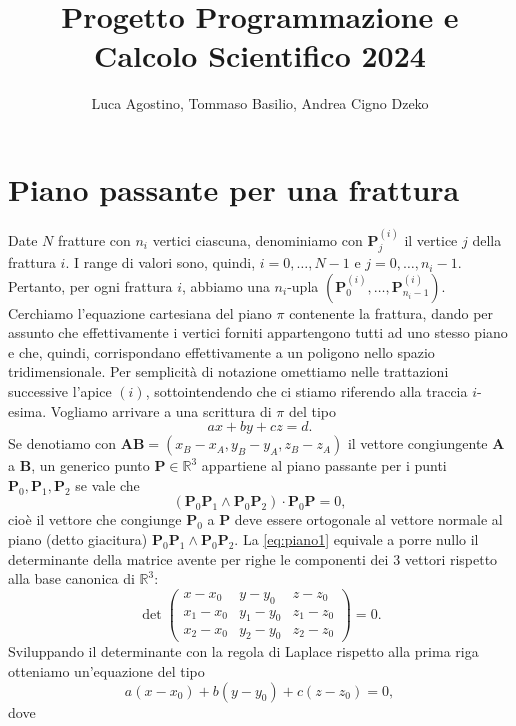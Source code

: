 \documentclass[a4paper]{article}
\title{Progetto Programmazione e Calcolo Scientifico 2024}
\author{Luca Agostino, Tommaso Basilio, Andrea Cigno Dzeko}
\newcommand{\B}{\mathbf}
\begin{document}
\maketitle

\tableofcontents


\section{Piano passante per una frattura}
Date $N$ fratture con $n_i$ vertici ciascuna, denominiamo con $\B{P}^{(i)}_j$ il vertice $j$ della frattura $i$. I range di valori sono, quindi, $i=0,\dots,N-1$ e $j=0,\dots,n_i-1$. Pertanto, per ogni frattura $i$, abbiamo una $n_i$-upla $(\B{P}^{(i)}_0,\dots,\B{P}^{(i)}_{n_i-1})$. Cerchiamo l'equazione cartesiana del piano $\pi$ contenente la frattura, dando per assunto che effettivamente i vertici forniti appartengono tutti ad uno stesso piano e che, quindi, corrispondano effettivamente a un poligono nello spazio tridimensionale. Per semplicità di notazione omettiamo nelle trattazioni successive l'apice $(i)$, sottointendendo che ci stiamo riferendo alla traccia $i$-esima. Vogliamo arrivare a una scrittura di $\pi$ del tipo $$ax+by+cz=d.$$
Se denotiamo con ${\B{A}\B{B}}=(x_B-x_A,y_B-y_A,z_B-z_A)$ il vettore congiungente $\B{A}$ a $\B{B}$, un generico punto $\B{P}\in\mathbb{R}^3$ appartiene al piano passante per i punti $\B{P}_0,\B{P}_1,\B{P}_2$ se vale che 
\begin{equation}\label{eq:piano1}
(\B{P}_0\B{P}_1\wedge \B{P}_0\B{P}_2)\cdot \B{P}_0\B{P}=0,
\end{equation} 
cioè il vettore che congiunge $\B{P}_0$ a $\B{P}$ deve essere ortogonale al vettore normale al piano (detto giacitura) $\B{P}_0\B{P}_1\wedge \B{P}_0\B{P}_2$. 
La \eqref{eq:piano1} equivale a porre nullo il determinante della matrice avente per righe le componenti dei $3$ vettori rispetto alla base canonica di $\mathbb{R}^3$: 
$$
\det\begin{pmatrix} x-x_0 & y-y_0 & z-z_0 \\ x_1-x_0 & y_1-y_0 & z_1-z_0 \\x_2-x_0 & y_2-y_0 & z_2-z_0 \end{pmatrix}=0.
$$
Sviluppando il determinante con la regola di Laplace rispetto alla prima riga otteniamo un'equazione del tipo 
\begin{equation}\label{eq:piano2}
a\left(x-x_0\right)+b\left(y-y_0\right)+c\left(z-z_0\right)=0,
\end{equation} 
dove 
\end{document}
